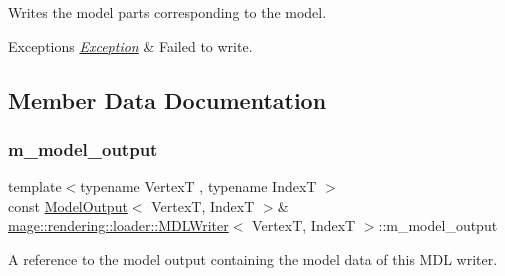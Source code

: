 Writes the model parts corresponding to the model.


\begin{DoxyExceptions}{Exceptions}
{\em \hyperlink{classmage_1_1_exception}{Exception}} & Failed to write. \\
\hline
\end{DoxyExceptions}


\subsection{Member Data Documentation}
\hypertarget{classmage_1_1rendering_1_1loader_1_1_m_d_l_writer_aefa6dfd7c4d7e2abe92e9c93b1e8638c}{}\label{classmage_1_1rendering_1_1loader_1_1_m_d_l_writer_aefa6dfd7c4d7e2abe92e9c93b1e8638c} 
\subsubsection{\texorpdfstring{m\+\_\+model\+\_\+output}{m\_model\_output}}
{\footnotesize\ttfamily template$<$typename VertexT , typename IndexT $>$ \\
const \hyperlink{structmage_1_1rendering_1_1_model_output}{Model\+Output}$<$ VertexT, IndexT $>$\& \hyperlink{classmage_1_1rendering_1_1loader_1_1_m_d_l_writer}{mage\+::rendering\+::loader\+::\+M\+D\+L\+Writer}$<$ VertexT, IndexT $>$\+::m\+\_\+model\+\_\+output\hspace{0.3cm}{\ttfamily [private]}}

A reference to the model output containing the model data of this M\+DL writer. 